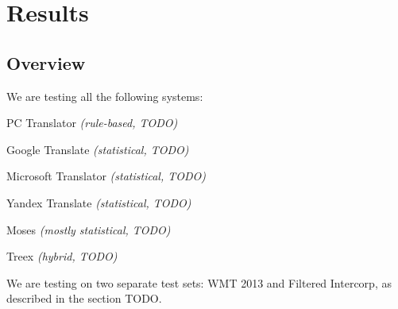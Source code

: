 \chapter{Results}

\section{Overview}
\label{overvieweval}
We are testing all the following systems:
\begin{pitemize}
\item PC Translator \emph{(rule-based, TODO)}
\item Google Translate \emph{(statistical, TODO)}
\item Microsoft Translator \emph{(statistical, TODO)}
\item Yandex Translate \emph{(statistical, TODO)}
\item Moses \emph{(mostly statistical, TODO)}
\item Treex \emph{(hybrid, TODO)}
\end{pitemize}

We are testing on two separate test sets: WMT 2013 and Filtered Intercorp, as described in the section TODO.

